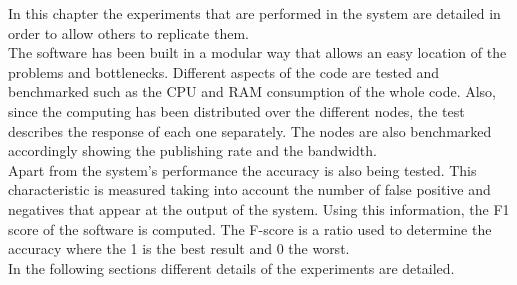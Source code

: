 
In this chapter the experiments that are performed in the system are detailed in order to allow others to replicate them. 
\\%

The software has been built in a modular way that allows an easy location of the problems and bottlenecks.
Different aspects of the code are tested and benchmarked such as the CPU and RAM consumption of the whole code. 
Also, since the computing has been distributed over the different nodes, the test describes the response of each one separately. 
The nodes are also benchmarked accordingly showing the publishing rate and the bandwidth. 
\\%


Apart from the system's performance the accuracy is also being tested. 
This characteristic is measured taking into account the number of false positive and negatives that appear at the output of the system. 
Using this information, the F1 score of the software is computed. 
The F-score is a ratio used to determine the accuracy where the 1 is the best result and 0 the worst. 
\\%

In the following sections different details of the experiments are detailed. 

